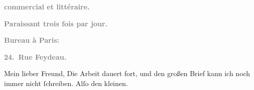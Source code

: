 \pstart
           \begin{otherlanguage}{french}\textcolor{gray}{\textbf{commercial et littéraire.}}\end{otherlanguage}\pend
           
\pstart
           \begin{otherlanguage}{french}\textcolor{gray}{\textbf{\textbf{Paraissant trois fois par jour.}}}\end{otherlanguage}\pend
           
\pstart
           \begin{otherlanguage}{french}\textcolor{gray}{\textbf{\textbf{Bureau à Paris:}}}\end{otherlanguage}\pend
           
\pstart
           \begin{otherlanguage}{french}\textcolor{gray}{\textbf{\textbf{24. Rue Feydeau.}}}\end{otherlanguage}\pend
           
\pstart\center{}Mein lieber Freund,\pend\vspace{0.5em}
\pstart
           Die Arbeit dauert fort, und den großen Brief kann ich noch immer nicht{ }ſchreiben.
               Alſo den kleinen.\pend
           
